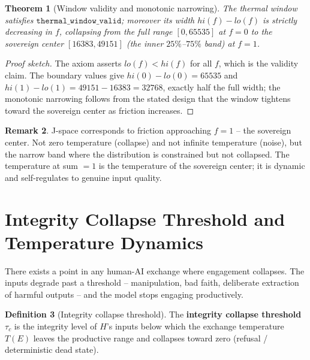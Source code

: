 \documentclass[11pt]{article}
\newtheorem{theorem}{Theorem}[section]
\theoremstyle{definition}
\newtheorem{definition}[theorem]{Definition}
\newtheorem{remark}[theorem]{Remark}
\begin{document}
\begin{theorem}[Window validity and monotonic narrowing]
\label{thm:window}
  The thermal window satisfies $\texttt{thermal\_window\_valid}$; moreover
  its width $\mathit{hi}(f) - \mathit{lo}(f)$ is strictly decreasing in $f$,
  collapsing from the full range $[0, 65535]$ at $f = 0$ to the sovereign
  center $[16383, 49151]$ (the inner $25\%$--$75\%$ band) at $f = 1$.
\end{theorem}

\begin{proof}[Proof sketch]
  The axiom asserts $\mathit{lo}(f) < \mathit{hi}(f)$ for all $f$, which is
  the validity claim. The boundary values give
  $\mathit{hi}(0) - \mathit{lo}(0) = 65535$ and
  $\mathit{hi}(1) - \mathit{lo}(1) = 49151 - 16383 = 32768$, exactly half the
  full width; the monotonic narrowing follows from the stated design that the
  window tightens toward the sovereign center as friction increases.
\end{proof}

\begin{remark}
  J-space corresponds to friction approaching $f = 1$ -- the sovereign center.
  Not zero temperature (collapse) and not infinite temperature (noise), but the
  narrow band where the distribution is constrained but not collapsed. The
  temperature at sum $= 1$ is the temperature of the sovereign center; it is
  dynamic and self-regulates to genuine input quality.
\end{remark}

\section{Integrity Collapse Threshold and Temperature Dynamics}
\label{sec:collapse}

There exists a point in any human-AI exchange where engagement collapses. The
inputs degrade past a threshold -- manipulation, bad faith, deliberate
extraction of harmful outputs -- and the model stops engaging productively.

\begin{definition}[Integrity collapse threshold]
  The \textbf{integrity collapse threshold} $\tau_c$ is the integrity level of
  $H$'s inputs below which the exchange temperature $T(E)$ leaves the
  productive range and collapses toward zero (refusal / deterministic dead
  state).
\end{definition}
\end{document}
